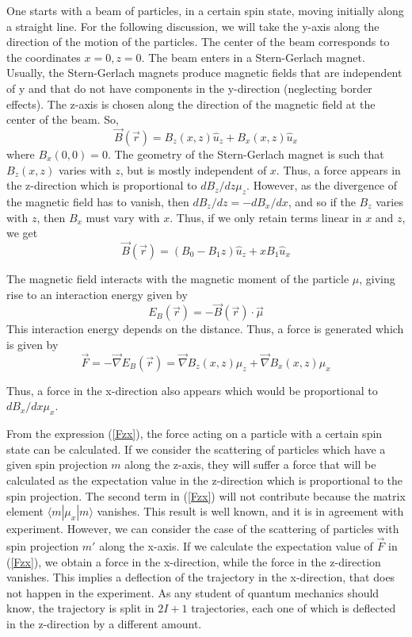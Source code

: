 \documentclass[aps,preprint,prl]{revtex4-2}
\def\grad{\vec\nabla}
\newcommand{\be}{\begin{equation}}
\newcommand{\ee}{\end{equation}}
\begin{document}
One starts with a beam of 
particles, in a certain spin state, moving initially along a straight line. 
For the following discussion, 
we will take the y-axis along the direction of the motion of the particles.
The center of the beam corresponds to the coordinates $x=0, z=0$.
The beam enters in a Stern-Gerlach magnet.
Usually, the Stern-Gerlach magnets produce magnetic fields that are independent
of y  and that do not have components in the
y-direction (neglecting border effects). 
The z-axis is chosen along the direction of the magnetic field at the 
center of the beam. So,
\be
\vec B(\vec r) = B_z(x,z) \hat u_z + B_x(x,z) \hat u_x
\ee
where $B_x(0,0)=0$.
The geometry of the Stern-Gerlach magnet is such that $B_z(x,z)$ varies with 
 $z$, but is mostly independent of $x$. Thus, a force appears in 
the z-direction which is proportional
to $dB_z/dz \mu_z$. However, as the divergence of 
the magnetic field has to vanish, then $dB_z/dz=-dB_x/dx$, and so if the
$B_z$ varies with  $z$, then $B_x$ must vary with  $x$. Thus, if we only retain
terms linear in $x$ and $z$, we get
\be
\vec{B}(\vec r) = (B_0 - B_1 z)\hat{u}_z + x B_1 \hat u_x
\ee

The magnetic field interacts with the magnetic moment of the
particle $\mu$, giving rise to an interaction energy given by
\be
E_B(\vec r) = - \vec B(\vec r) \cdot \vec \mu
\ee
This interaction energy depends on the distance. Thus, a  force is generated
which is given by
\be
\vec F = -\grad E_B(\vec r) = \grad B_z(x,z) \mu_z + \grad B_x(x,z) \mu_x
\label{Fzx}
\ee

Thus, a force in the x-direction also appears which would be 
proportional to $dB_x/dx \mu_x$.


From the expression (\ref{Fzx}), the force acting on a particle with a certain 
spin state can be calculated. If we consider the scattering of particles which
have a given spin projection $m$ along the z-axis, they will suffer a force
that will be calculated as the expectation value
in the z-direction which is proportional to the spin projection. The second
term  in (\ref{Fzx}) will not contribute because the matrix element
$\langle m|\mu_x| m \rangle$ vanishes. This result is well known, and it is in agreement
with experiment. However, we can consider the case of the scattering of
particles with spin projection $m'$ along the x-axis. If we calculate the
expectation value of $\vec F$ in (\ref{Fzx}), we  obtain a force in the
x-direction, while the force in the z-direction vanishes. This  implies a
deflection of the trajectory in the x-direction, that does not  happen
in the experiment. As any student of quantum mechanics should know, the 
trajectory is split in $2I+1$ trajectories, each one of which is deflected
in the z-direction by a different amount.
\end{document}

